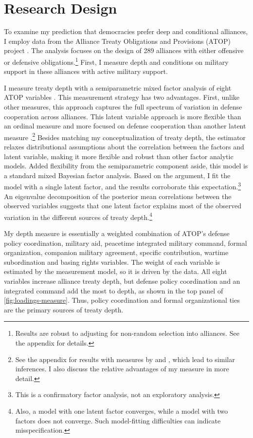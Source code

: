 \documentclass[12pt]{article}
\begin{document}
\section{Research Design}



To examine my prediction that democracies prefer deep and conditional alliances, I employ data from the Alliance Treaty Obligations and Provisions (ATOP) project \citep{Leedsetal2002}. 
The analysis focuses on the design of 289 alliances with either offensive or defensive obligations.\footnote{Results are robust to adjusting for non-random selection into alliances. See the appendix for details.}
First, I measure depth and conditions on military support in these alliances with active military support. 


I measure treaty depth with a semiparametric mixed factor analysis of eight ATOP variables \citep{Murrayetal2013}.
This measurement strategy has two advantages. 
First, unlike other measures, this approach captures the full spectrum of variation in defense cooperation across alliances.
This latent variable approach is more flexible than an ordinal measure \citep{LeedsAnac2005} and more focused on defense cooperation than another latent measure \citep{BensonClinton2016}.\footnote{See the appendix for results with measures by \citet{LeedsAnac2005} and \citet{BensonClinton2016}, which lead to similar inferences. I also discuss the relative advantages of my measure in more detail.}
Besides matching my conceptualization of treaty depth, the estimator relaxes distributional assumptions about the correlation between the factors and latent variable, making it more flexible and robust than other factor analytic models. 
Added flexibility from the semiparametric component aside, this model is a standard mixed Bayesian factor analysis. 
Based on the argument, I fit the model with a single latent factor, and the results corroborate this expectation.\footnote{This is a confirmatory factor analysis, not an exploratory analysis.}
An eigenvalue decomposition of the posterior mean correlations between the observed variables suggests that one latent factor explains most of the observed variation in the different sources of treaty depth.\footnote{Also, a model with one latent factor converges, while a model with two factors does not converge. Such model-fitting difficulties can indicate misspecification.} 


My depth measure is essentially a weighted combination of ATOP's defense policy coordination, military aid, peacetime integrated military command, formal organization, companion military agreement, specific contribution, wartime subordination and basing rights variables.
The weight of each variable is estimated by the measurement model, so it is driven by the data.  
All eight variables increase alliance treaty depth, but defense policy coordination and an integrated command add the most to depth, as shown in the top panel of \autoref{fig:loadings-measure}. 
Thus, policy coordination and formal organizational ties are the primary sources of treaty depth. 
\end{document}
